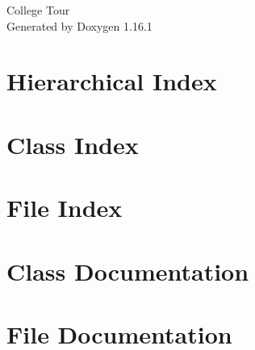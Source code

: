 \documentclass[twoside]{book}
\newcommand{\+}{\discretionary{\mbox{\scriptsize$\hookleftarrow$}}{}{}}
\newcommand{\clearemptydoublepage}{%
    \newpage{\pagestyle{empty}\cleardoublepage}%
  }
\begin{document}
  \raggedbottom
    \hypersetup{pageanchor=false,
                bookmarksnumbered=true,
                pdfencoding=unicode
               }
  \begin{titlepage}
  \vspace*{7cm}
  \begin{center}%
  {\Large College  Tour}\\
  \vspace*{1cm}
  {\large Generated by Doxygen 1.16.1}\\
  \end{center}
  \end{titlepage}
  \clearemptydoublepage
  \tableofcontents
  \clearemptydoublepage
  \hypersetup{pageanchor=true}

\chapter{Hierarchical Index}

\chapter{Class Index}

\chapter{File Index}

\chapter{Class Documentation}



















\chapter{File Documentation}















  \backmatter
  \newpage
  \clearemptydoublepage
  \printindex
\end{document}
